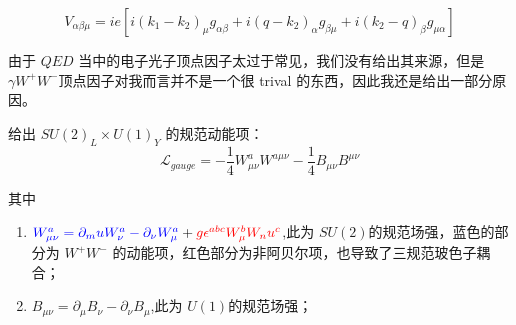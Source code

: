 \documentclass{article}
\begin{document}
\begin{minipage}{0.3\textwidth}
    \begin{center}
    \end{center}
\end{minipage}
\hfill
\begin{minipage}{0.7\textwidth}
    \begin{equation}
        V_{\alpha\beta\mu} = ie\left[i(k_1 - k_2)_{\mu}g_{\alpha\beta} + i\left(q - k_2\right)_{\alpha}g_{\beta\mu} + i\left(k_2 - q\right)_{\beta}g_{\mu\alpha}\right] 
    \end{equation}
\end{minipage}



由于 $QED$ 当中的电子光子顶点因子太过于常见，我们没有给出其来源，但是 $\gamma W^{+}W^{-}$顶点因子对我而言并不是一个很 trival 的东西，因此我还是给出一部分原因。


给出 $SU(2)_{L} \times U(1)_Y$ 的规范动能项：
\begin{equation}
    \mathcal{L}_{gauge} = -\frac{1}{4}W_{\mu\nu}^{a}W^{a\mu\nu} - \frac{1}{4}B_{\mu\nu}B^{\mu\nu}
\end{equation}

其中
\begin{enumerate}
    \item $\textcolor{blue}{W_{\mu\nu}^{a} = \partial_mu W_{\nu}^a - \partial_\nu W_{\mu}^a} + \textcolor{red}{g \epsilon^{abc}W_\mu^b W_nu^c}$,此为 $SU(2)$的规范场强，蓝色的部分为 $W^+ W^-$ 的动能项，红色部分为非阿贝尔项，也导致了三规范玻色子耦合；
    \item $B_{\mu\nu} = \partial_\mu B_\nu - \partial_\nu B_\mu$,此为 $U(1)$的规范场强； 
\end{enumerate}
\end{document}
